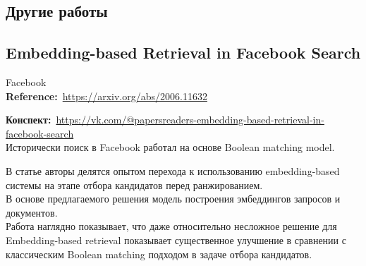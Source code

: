 \begin{bibunit}[plainnat]











\chapter{Другие работы}

\section*{Embedding-based Retrieval in Facebook Search}

Facebook \\

\textbf{Reference:}~\url{https://arxiv.org/abs/2006.11632}

\textbf{Конспект:}~\url{https://vk.com/@papersreaders-embedding-based-retrieval-in-facebook-search} \\

Исторически поиск в Facebook работал на основе Boolean matching model.

В статье авторы делятся опытом перехода к использованию embedding-based системы на этапе отбора кандидатов перед ранжированием. \\

В основе предлагаемого решения модель построения эмбеддингов запросов и документов. \\

Работа наглядно показывает, что даже относительно несложное решение для Embedding-based retrieval показывает существенное улучшение в сравнении с классическим Boolean matching подходом в задаче отбора кандидатов.


\end{bibunit}
